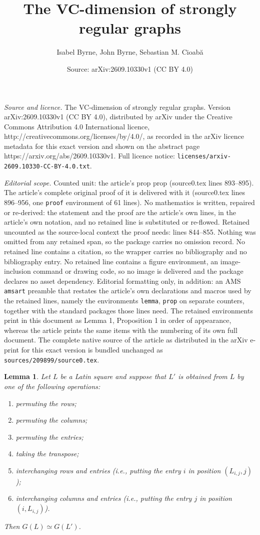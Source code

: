 \documentclass[10pt,a4paper]{amsart}
\title{The VC-dimension of strongly regular graphs}
\author{Isabel Byrne, John Byrne, Sebastian M. Cioab\u{a}}
\date{Source: arXiv:2609.10330v1 (CC BY 4.0)}
\newtheorem{lemma}{Lemma}
\begin{document}
\maketitle

\noindent\emph{Source and licence.} The VC-dimension of strongly regular graphs. Version arXiv:2609.10330v1 (CC BY 4.0), distributed by arXiv under the Creative Commons Attribution 4.0 International licence, http://creativecommons.org/licenses/by/4.0/, as recorded in the arXiv licence metadata for this exact version and shown on the abstract page https://arxiv.org/abs/2609.10330v1. Full licence notice: \texttt{licenses/arxiv-2609.10330-CC-BY-4.0.txt}.\par\smallskip

\noindent\textit{Editorial scope.} Counted unit: the article's prop prop (source0.tex lines 893--895). The article's complete original proof of it is delivered with it (source0.tex lines 896--956, one \texttt{proof} environment of 61 lines). No mathematics is written, repaired or re-derived: the statement and the proof are the article's own lines, in the article's own notation, and no retained line is substituted or re-flowed.  Retained uncounted as the source-local context the proof needs: lines 844--855.  Nothing was omitted from any retained span, so the package carries no omission record.  No retained line contains a citation, so the wrapper carries no bibliography and no bibliography entry.  No retained line contains a figure environment, an image-inclusion command or drawing code, so no image is delivered and the package declares no asset dependency.  Editorial formatting only, in addition: an AMS \texttt{amsart} preamble that restates the article's own declarations and macros used by the retained lines, namely the environments \texttt{lemma}, \texttt{prop} on separate counters, together with the standard packages those lines need.  The retained environments print in this document as Lemma 1, Proposition 1 in order of appearance, whereas the article prints the same items with the numbering of its own full document.  The complete native source of the article as distributed in the arXiv e-print for this exact version is bundled unchanged as \texttt{sources/209899/source0.tex}.
\begin{lemma} \label{Lemma Latin square transformations}
Let $L$ be a Latin square and suppose that $L'$ is obtained from $L$ by one of the following operations:
\begin{enumerate}
    \item permuting the rows;
    \item permuting the columns;
    \item permuting the entries;
    \item taking the transpose;
    \item interchanging rows and entries (i.e., putting the entry $i$ in position $(L_{i,j},j)$);
    \item interchanging columns and entries (i.e., putting the entry $j$ in position $(i,L_{i,j})$).
\end{enumerate}
Then $G(L)\simeq G(L')$.
\end{lemma}
\end{document}
